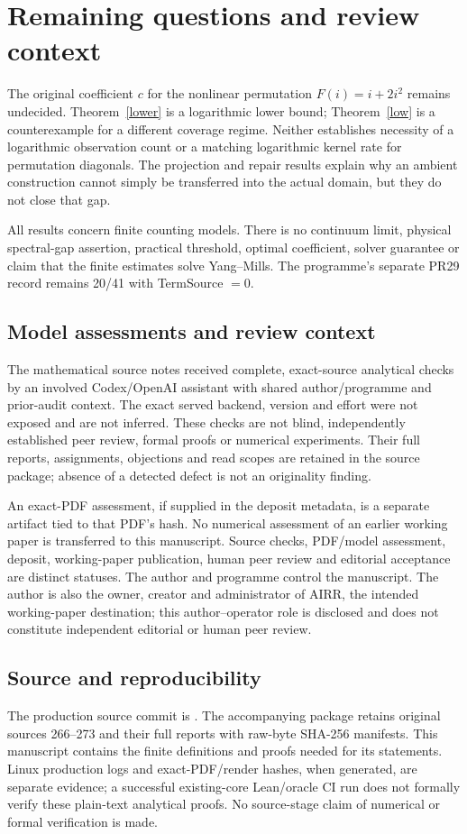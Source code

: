 \documentclass[11pt,a4paper]{article}
\providecommand{\SourceCommit}{\errmessage{Supply the frozen SourceCommit}}
\begin{document}
\section{Remaining questions and review context}
The original coefficient $c$ for the nonlinear permutation $F(i)=i+2i^2$
remains undecided. Theorem~\ref{lower} is a logarithmic lower bound;
Theorem~\ref{low} is a counterexample for a different coverage regime.
Neither establishes necessity of a logarithmic observation count or a
matching logarithmic kernel rate for permutation diagonals. The projection
and repair results explain why an ambient construction cannot simply be
transferred into the actual domain, but they do not close that gap.

All results concern finite counting models. There is no continuum limit,
physical spectral-gap assertion, practical threshold, optimal coefficient,
solver guarantee or claim that the finite estimates solve Yang--Mills.
The programme's separate PR29 record remains 20/41 with TermSource $=0$.

\subsection*{Model assessments and review context}
The mathematical source notes received complete, exact-source analytical
checks by an involved Codex/OpenAI assistant with shared author/programme and
prior-audit context. The exact served backend, version and effort were not
exposed and are not inferred. These checks are not blind, independently
established peer review, formal proofs or numerical experiments. Their full
reports, assignments, objections and read scopes are retained in the source
package; absence of a detected defect is not an originality finding.

An exact-PDF assessment, if supplied in the deposit metadata, is a separate
artifact tied to that PDF's hash. No numerical assessment of an earlier
working paper is transferred to this manuscript. Source checks, PDF/model
assessment, deposit, working-paper publication, human peer review and editorial
acceptance are distinct statuses. The author and programme control the
manuscript. The author is also the owner, creator and administrator of AIRR,
the intended working-paper destination; this author--operator role is disclosed
and does not constitute independent editorial or human peer review.

\subsection*{Source and reproducibility}
The production source commit is
\texttt{\SourceCommit}. The accompanying package retains original sources
266--273 and their full reports with raw-byte SHA-256 manifests. This manuscript
contains the finite definitions and proofs needed for its statements. Linux
production logs and exact-PDF/render hashes, when generated, are separate
evidence; a successful existing-core Lean/oracle CI run does not formally verify
these plain-text analytical proofs. No source-stage claim of numerical or
formal verification is made.
\end{document}
